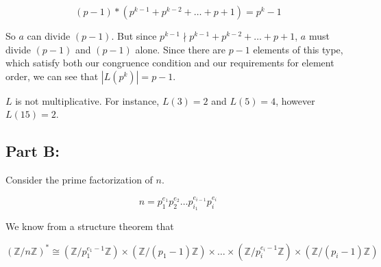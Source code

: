 \documentclass[12pt]{article}
\theoremstyle{moo}
\def\zz{{\mathbb Z}}
\begin{document}
\[(p-1)*(p^{k-1} + p^{k-2} + \ldots + p + 1) = p^k - 1 \]

So $a$ can divide $(p-1)$. But since $p^{k-1} \nmid p^{k-1} + p^{k-2} + \ldots + p + 1$, $a$ must divide $(p-1)$ and $(p-1)$ alone. Since there are $p-1$ elements of this type, which satisfy both our congruence condition and our requirements for element order, we can see that $|L(p^k)| = p-1$.

$L$ is not multiplicative. For instance, $L(3) = 2$ and $L(5) = 4$, however $L(15) = 2$.


\subsection*{Part B:}
Consider the prime factorization of $n$.

\[
n = p_1^{e_1}p_2^{e_2} \ldots p_{i_1}^{e_{i-1}}p_i^{e_i}
\]

We know from a structure theorem that 

\[
\left(\zz/n\zz\right)^* \cong \left(\zz/p_1^{e_1-1}\zz \right) \times \left(\zz/(p_1-1)\zz \right) \times \ldots \times \left(\zz/p_i^{e_i-1}\zz \right) \times \left(\zz/(p_i-1)\zz \right)
\]
\end{document}
